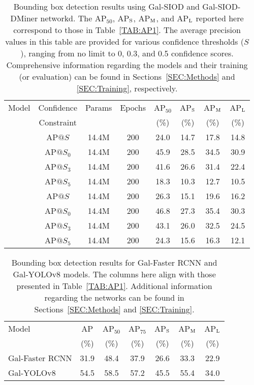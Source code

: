 \documentclass[
  journal=pasa,
  manuscript=research-paper, %
  year=2020,
  volume=37,
]{cup-journal}
\begin{document}
%
\begin{table*}
    \centering
    \caption{Bounding box detection results using Gal-SIOD and Gal-SIOD-DMiner networkd. The AP$_{50}$, AP$_{\rm S}$, AP$_{\rm M}$, and AP$_{\rm L}$ reported here correspond to those in Table~\ref{TAB:AP1}. The average precision values in this table are provided for various confidence thresholds ($S$), ranging from no limit to 0, 0.3, and 0.5 confidence scores. Comprehensive information regarding the models and their training (or evaluation) can be found in Sections~\ref{SEC:Methods} and \ref{SEC:Training}, respectively.}
    \begin{NiceTabular}{cccccccc}
    \toprule
Model & Confidence  & Params  & Epochs     & AP$_{50}$  & AP$_{\rm S}$ & AP$_{\rm M}$  & AP$_{\rm L}$  \\
      & Constraint  &         &            & (\%)    & (\%) & (\%) & (\%)  \\
    \midrule
    & AP$@S$        & 14.4M   & 200        & 24.0  & 14.7  & 17.8  & 14.8  \\
    & AP$@S_0$      & 14.4M   & 200        & 45.9  & 28.5  & 34.5  & 30.9  \\
    & AP$@S_3$      & 14.4M   & 200        & 41.6  & 26.6  & 31.4  & 22.4  \\
    & AP$@S_5$      & 14.4M   & 200        & 18.3  & 10.3  & 12.7  & 10.5  \\
    \midrule
    & AP$@S$       & 14.4M   & 200         & 26.3  & 15.1  & 19.6  & 16.2  \\
    & AP$@S_0$     & 14.4M   & 200         & 46.8  & 27.3  & 35.4  & 30.3  \\
    & AP$@S_3$     & 14.4M   & 200         & 43.1  & 26.0  & 32.5  & 24.5  \\
    & AP$@S_5$     & 14.4M   & 200         & 24.3  & 15.6  & 16.3  & 12.1  \\
    \bottomrule
    \end{NiceTabular}
    \label{TAB:AP2}
\end{table*}
%

\begin{table}
    \centering
    \caption{Bounding box detection results for Gal-Faster RCNN and Gal-YOLOv8 models. The columns here align with those presented in Table~\ref{TAB:AP1}. Additional information regarding the networks can be found in Sections~\ref{SEC:Methods} and \ref{SEC:Training}.}
    \begin{tabular}{lcccccc}
    \toprule
Model           & AP    & AP$_{50}$ &AP$_{75}$ & AP$_{\rm S}$ & AP$_{\rm M}$    & AP$_{\rm L}$ \\
                & (\%)  & (\%)      &  (\%)    & (\%)         & (\%) & (\%) \\
\midrule
Gal-Faster RCNN  & 31.9  & 48.4      & 37.9     & 26.6         & 33.3     & 22.9\\
Gal-YOLOv8      & 54.5  & 58.5      & 57.2     & 45.5         & 55.4     & 34.0\\
    \bottomrule
    \end{tabular}
    \label{TAB:AP3}
\end{table}
\end{document}
